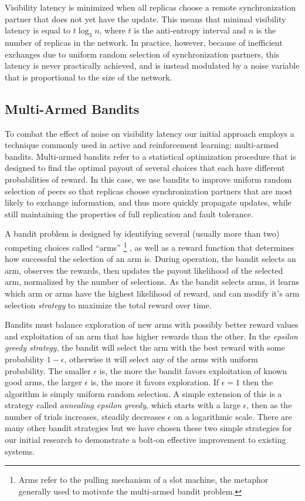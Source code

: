 Visibility latency is minimized when all replicas choose a remote
synchronization partner that does not yet have the update.
This means that minimal visibility latency is equal to $t\log_3n$, where
$t$ is the anti-entropy interval and $n$ is the number of replicas in the
network.
In practice, however, because of inefficient exchanges due to uniform random
selection of synchronization partners, this latency is never practically
achieved, and is instead modulated by a noise variable that is
proportional to the size of the network.

\subsection{Multi-Armed Bandits}

To combat the effect of noise on visibility latency our initial approach
employs a technique commonly used in active and reinforcement learning:
multi-armed bandits.
Multi-armed bandits refer to a statistical optimization procedure that is
designed to find the optimal payout of several choices that each have
different probabilities of reward.
In this case, we use bandits to improve uniform random selection of peers so
that replicas choose synchronization partners that are most likely to exchange
information, and thus more quickly propagate updates, while still maintaining
the properties of full replication and fault tolerance.

A bandit problem is designed by identifying several (usually more than two)
competing choices called ``arms''\renewcommand{\baselinestretch}{1} \small\footnotesize\footnote{Arms refer to the pulling
mechanism of a slot machine, the metaphor generally used to motivate the
multi-armed bandit problem.}\renewcommand{\baselinestretch}{2} \small\normalsize, as well as a reward function that determines how
successful the selection of an arm is.
During operation, the bandit selects an arm, observes the rewards, then
updates the payout likelihood of the selected arm, normalized by the number
of selections.
As the bandit selects arms, it learns which arm or arms have the highest
likelihood of reward, and can modify it's arm selection \emph{strategy} to
maximize the total reward over time.

Bandits must balance exploration of new arms with possibly better reward
values and exploitation of an arm that has higher rewards than the other.
In the \emph{epsilon greedy strategy}, the bandit will select the arm with
the best reward with some probability $1-\epsilon$, otherwise it will select
any of the arms with uniform probability.
The smaller $\epsilon$ is, the more the bandit favors exploitation of known
good arms, the larger $\epsilon$ is, the more it favors exploration.
If $\epsilon=1$ then the algorithm is simply uniform random selection.
A simple extension of this is a strategy called \emph{annealing epsilon
greedy}, which starts with a large $\epsilon$, then as the number of trials
increases, steadily decreases $\epsilon$ on a logarithmic scale.
There are many other bandit strategies but we have chosen these two simple
strategies for our initial research to demonstrate a bolt-on effective
improvement to existing systems.

